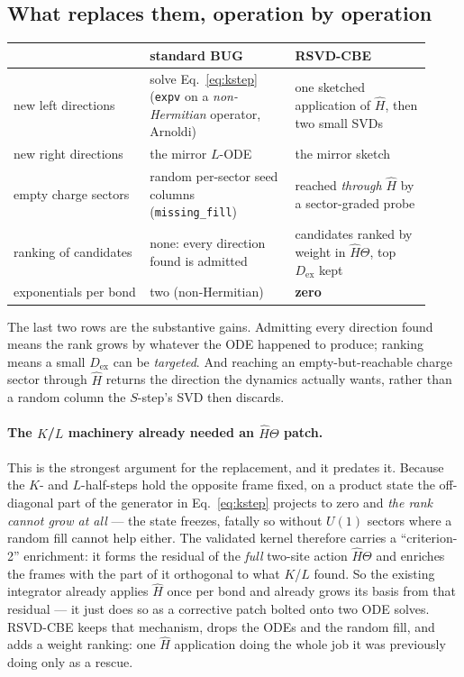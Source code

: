 \documentclass[11pt,a4paper]{article}
\newcommand{\Hb}{\hat{H}}
\newcommand{\Theb}{\Theta}
\newcommand{\Dex}{D_{\mathrm{ex}}}
\newcommand{\code}[1]{\texttt{\small #1}}
\begin{document}
\subsection{What replaces them, operation by operation}

\begin{center}
\begin{tabular}{@{}p{0.30\linewidth}p{0.32\linewidth}p{0.30\linewidth}@{}}
\toprule
& \textbf{standard BUG} & \textbf{RSVD-CBE} \\
\midrule
new left directions & solve Eq.~\eqref{eq:kstep} (\code{expv} on a
\emph{non-Hermitian} operator, Arnoldi) & one sketched application of $\Hb$, then two small
SVDs \\
new right directions & the mirror $L$-ODE & the mirror sketch \\
empty charge sectors & random per-sector seed columns (\code{missing\_fill}) & reached
\emph{through} $\Hb$ by a sector-graded probe \\
ranking of candidates & none: every direction found is admitted & candidates ranked by weight
in $\Hb\Theb$, top $\Dex$ kept \\
exponentials per bond & two (non-Hermitian) & \textbf{zero} \\
\bottomrule
\end{tabular}
\end{center}

\noindent
The last two rows are the substantive gains. Admitting every direction found means the rank
grows by whatever the ODE happened to produce; ranking means a small $\Dex$ can be
\emph{targeted}. And reaching an empty-but-reachable charge sector through $\Hb$ returns the
direction the dynamics actually wants, rather than a random column the $S$-step's SVD then
discards.

\paragraph{The $K$/$L$ machinery already needed an $\Hb\Theb$ patch.} This is the strongest
argument for the replacement, and it predates it. Because the $K$- and $L$-half-steps hold the
opposite frame fixed, on a product state the off-diagonal part of the generator in
Eq.~\eqref{eq:kstep} projects to zero and \emph{the rank cannot grow at all} --- the state
freezes, fatally so without $U(1)$ sectors where a random fill cannot help either. The validated
kernel therefore carries a ``criterion-2'' enrichment: it forms the residual of the \emph{full}
two-site action $\Hb\Theb$ and enriches the frames with the part of it orthogonal to what $K$/$L$
found. So the existing integrator already applies $\Hb$ once per bond and already grows its basis
from that residual --- it just does so as a corrective patch bolted onto two ODE solves.
RSVD-CBE keeps that mechanism, drops the ODEs and the random fill, and adds a weight ranking:
one $\Hb$ application doing the whole job it was previously doing only as a rescue.
\end{document}
